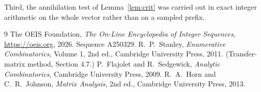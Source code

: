 \documentclass[11pt,a4paper]{article}
\theoremstyle{plain}
\theoremstyle{definition}
\begin{document}
Third, the annihilation test of Lemma~\ref{lem:crit} was carried out in exact integer
arithmetic on the whole vector rather than on a sampled prefix.

\begin{thebibliography}{9}
 The OEIS Foundation, \emph{The On-Line Encyclopedia of Integer
Sequences}, \url{https://oeis.org}, 2026. Sequence A250329.
 R.~P.~Stanley, \emph{Enumerative Combinatorics}, Volume 1, 2nd ed.,
Cambridge University Press, 2011. (Transfer-matrix method, Section 4.7.)
 P.~Flajolet and R.~Sedgewick, \emph{Analytic Combinatorics}, Cambridge
University Press, 2009.
 R.~A.~Horn and C.~R.~Johnson, \emph{Matrix Analysis}, 2nd ed., Cambridge
University Press, 2013.
\end{thebibliography}
\end{document}
